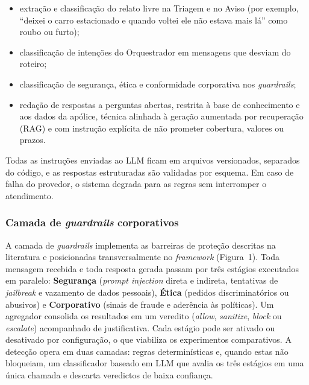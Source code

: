 \begin{itemize}
  \item extração e classificação do relato livre na Triagem e no Aviso (por exemplo, ``deixei o
        carro estacionado e quando voltei ele não estava mais lá'' como roubo ou furto);
  \item classificação de intenções do Orquestrador em mensagens que desviam do roteiro;
  \item classificação de segurança, ética e conformidade corporativa nos \textit{guardrails};
  \item redação de respostas a perguntas abertas, restrita à base de conhecimento e aos dados
        da apólice, técnica alinhada à geração aumentada por recuperação (RAG) e com instrução
        explícita de não prometer cobertura, valores ou prazos.
\end{itemize}

Todas as instruções enviadas ao LLM ficam em arquivos versionados, separados do código, e
as respostas estruturadas são validadas por esquema. Em caso de falha do provedor, o sistema
degrada para as regras sem interromper o atendimento.

\subsubsection{Camada de \textit{guardrails} corporativos}

A camada de \textit{guardrails} implementa as barreiras de proteção descritas na literatura
\cite{dong2024} e posicionadas transversalmente no \textit{framework} (Figura~1). Toda
mensagem recebida e toda resposta gerada passam por três estágios executados em paralelo:
\textbf{Segurança} (\textit{prompt injection} direta e indireta, tentativas de
\textit{jailbreak} e vazamento de dados pessoais), \textbf{Ética} (pedidos discriminatórios ou
abusivos) e \textbf{Corporativo} (sinais de fraude e aderência às políticas). Um agregador
consolida os resultados em um veredito (\textit{allow}, \textit{sanitize}, \textit{block} ou
\textit{escalate}) acompanhado de justificativa. Cada estágio pode ser ativado ou desativado
por configuração, o que viabiliza os experimentos comparativos. A detecção opera em duas
camadas: regras determinísticas e, quando estas não bloqueiam, um classificador baseado em LLM
que avalia os três estágios em uma única chamada e descarta veredictos de baixa confiança.

